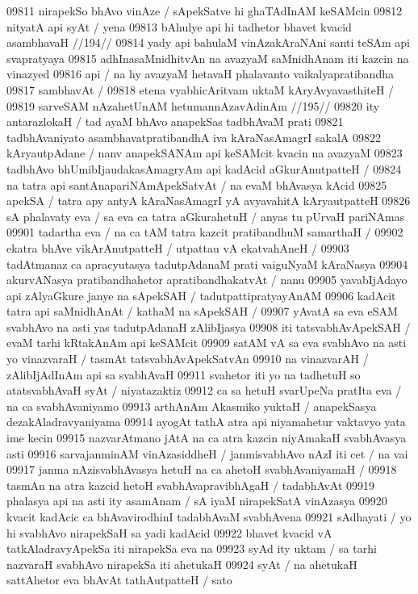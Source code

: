 09811 nirapekSo bhAvo vinAze / sApekSatve hi ghaTAdInAM keSAMcin 
09812 nityatA api syAt / yena 
09813 	bAhulye api hi tadhetor bhavet kvacid asambhavaH //194//  
09814 yady api bahulaM vinAzakAraNAni santi teSAm api svapratyaya  
09815 adhInasaMnidhitvAn na avazyaM saMnidhAnam iti kazcin na vinazyed
09816 api / na hy avazyaM hetavaH phalavanto vaikalyapratibandha  
09817 sambhavAt /  
09818 	etena vyabhicAritvam uktaM kAryAvyavasthiteH / 
09819 	sarveSAM nAzahetUnAM hetumannAzavAdinAm //195//
09820 ity antarazlokaH / tad ayaM bhAvo anapekSas tadbhAvaM prati
09821 tadbhAvaniyato asambhavatpratibandhA iva kAraNasAmagrI sakalA
09822 kAryautpAdane / nanv anapekSANAm api keSAMcit kvacin na avazyaM  
09823 tadbhAvo bhUmibIjaudakasAmagryAm api kadAcid aGkurAnutpatteH /
09824 na tatra api santAnapariNAmApekSatvAt / na evaM bhAvasya kAcid  
09825 apekSA / tatra apy antyA kAraNasAmagrI yA avyavahitA kAryautpatteH
09826 sA phalavaty eva / sa eva ca tatra aGkurahetuH / anyas tu pUrvaH pariNAmas
09901 tadartha eva / na ca tAM tatra kazcit pratibandhuM samarthaH / 
09902 ekatra bhAve vikArAnutpatteH / utpattau vA ekatvahAneH /  
09903 tadAtmanaz ca apracyutasya tadutpAdanaM prati vaiguNyaM kAraNasya  
09904 akurvANasya pratibandhahetor apratibandhakatvAt / nanu  
09905 yavabIjAdayo api zAlyaGkure janye na sApekSAH / tadutpattipratyayAnAM
09906 kadAcit tatra api saMnidhAnAt / kathaM na sApekSAH /  
09907 yAvatA sa eva eSAM svabhAvo na asti yas tadutpAdanaH zAlibIjasya 
09908 iti tatsvabhAvApekSAH / evaM tarhi kRtakAnAm api keSAMcit
09909 satAM vA sa eva svabhAvo na asti yo vinazvaraH / tasmAt tatsvabhAvApekSatvAn
09910 na vinazvarAH / zAlibIjAdInAm api sa svabhAvaH
09911 svahetor iti yo na tadhetuH so atatsvabhAvaH syAt / niyatazaktiz 
09912 ca sa hetuH svarUpeNa pratIta eva / na ca svabhAvaniyamo  
09913 arthAnAm Akasmiko yuktaH / anapekSasya dezakAladravyaniyama 
09914 ayogAt tathA atra api niyamahetur vaktavyo yata ime kecin  
09915 nazvarAtmano jAtA na ca atra kazcin niyAmakaH svabhAvasya asti  
09916 sarvajanminAM vinAzasiddheH / janmisvabhAvo nAzI iti cet / na vai 
09917 janma nAzisvabhAvasya hetuH na ca ahetoH svabhAvaniyamaH /  
09918 tasmAn na atra kazcid hetoH svabhAvapravibhAgaH / tadabhAvAt 
09919 phalasya api na asti ity asamAnam / sA iyaM nirapekSatA vinAzasya  
09920 kvacit kadAcic ca bhAvavirodhinI tadabhAvaM svabhAvena 
09921 sAdhayati / yo hi svabhAvo nirapekSaH sa yadi kadAcid
09922 bhavet kvacid vA tatkAladravyApekSa iti nirapekSa eva na
09923 syAd ity uktam / sa tarhi nazvaraH svabhAvo nirapekSa iti ahetukaH
09924 syAt / na ahetukaH sattAhetor eva bhAvAt tathAutpatteH / sato  
